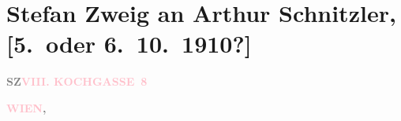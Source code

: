 

\renewcommand{\erwaehntePersonen}{Personen: Lili Cappellini, Johann Peter Eckermann, Johann Wolfgang von Goethe, Olga Schnitzler, Heinrich Schnitzler, Stefan Zweig}
\renewcommand{\erwaehnteOrte}{Orte: Bad Pyrmont, Kochgasse 8, Lügde, Sternwartestraße 71, Weimar, Wien}
\renewcommand{\erwaehnteWerke}{Werke: Der Ruf des Lebens. Schauspiel in drei Akten, Tag- und Jahreshefte, Tagebuch}
\section[Stefan Zweig an Arthur Schnitzler, {[}5. oder 6. 10. 1910?{]}]{Stefan Zweig an Arthur Schnitzler, {[}5. oder 6. 10. 1910?{]}}
\nopagebreak{}
\rehead{ }\normalsize\beginnumbering{}
\toendnotes[C]{\smallbreak\pagebreak[2]}
\toendnotes[C]{\smallbreak}
\pstart
           {\pb}\textcolor{gray}{\textbf{SZ}}\hfill \textcolor{gray}{\textbf{\textcolor{pink}{VIII. KOCHGASSE 8}{}\ledrightnote{\textcolor{pink}{Kochgasse 8}}}}\pend
           
\pstart
           \raggedleft{}\textcolor{gray}{\textbf{\textcolor{pink}{WIEN}{}\ledrightnote{\textcolor{pink}{Wien}},}}\pend
           
